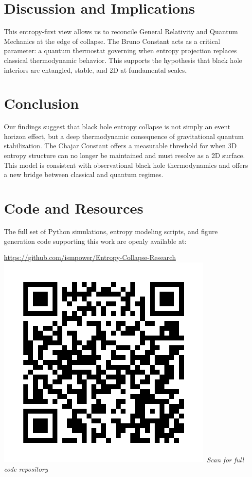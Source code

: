 \documentclass[12pt]{article}
\begin{document}
\section{Discussion and Implications}
This entropy-first view allows us to reconcile General Relativity and Quantum Mechanics at the edge of collapse. The Bruno Constant acts as a critical parameter: a quantum thermostat governing when entropy projection replaces classical thermodynamic behavior. This supports the hypothesis that black hole interiors are entangled, stable, and 2D at fundamental scales.

\section{Conclusion}
Our findings suggest that black hole entropy collapse is not simply an event horizon effect, but a deep thermodynamic consequence of gravitational quantum stabilization. The Chajar Constant offers a measurable threshold for when 3D entropy structure can no longer be maintained and must resolve as a 2D surface. This model is consistent with observational black hole thermodynamics and offers a new bridge between classical and quantum regimes.

\section*{Code and Resources}
The full set of Python simulations, entropy modeling scripts, and figure generation code supporting this work are openly available at:
\begin{center}
\url{https://github.com/ismpower/Entropy-Collapse-Research}
\includegraphics[width=0.3	extwidth]{qr-code.png}\
\textit{Scan for full code repository}\
\end{center}
\end{document}

